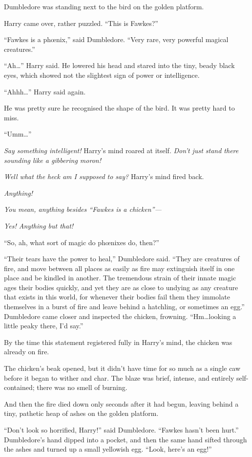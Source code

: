Dumbledore was standing next to the bird on the golden platform.

Harry came over, rather puzzled.
“This is Fawkes?”

“Fawkes is a phœnix,” said Dumbledore.
“Very rare, very powerful magical creatures.”

“Ah…” Harry said. He lowered his head and stared into the tiny, beady black eyes, which showed not the slightest sign of power or intelligence.

“Ahhh…” Harry said again.

He was pretty sure he recognised the shape of the bird. It was pretty hard to miss.

“Umm…”

\emph{Say something intelligent!} Harry’s mind roared at itself. \emph{Don’t just stand there sounding like a gibbering moron!}

\emph{Well what the heck am I \emph{supposed} to say?} Harry’s mind fired back.

\emph{Anything!}

\emph{You mean, anything besides
“Fawkes is a chicken”—}

\emph{Yes! Anything but that!}

“So, ah, what sort of magic do phœnixes do, then?”

“Their tears have the power to heal,” Dumbledore said.
“They are creatures of fire, and move between all places as easily as fire may extinguish itself in one place and be kindled in another. The tremendous strain of their innate magic ages their bodies quickly, and yet they are as close to undying as any creature that exists in this world, for whenever their bodies fail them they immolate themselves in a burst of fire and leave behind a hatchling, or sometimes an egg.” Dumbledore came closer and inspected the chicken, frowning.
“Hm…looking a little peaky there, I’d say.”

By the time this statement registered fully in Harry’s mind, the chicken was already on fire.

The chicken’s beak opened, but it didn’t have time for so much as a single caw before it began to wither and char. The blaze was brief, intense, and entirely self-contained; there was no smell of burning.

And then the fire died down only seconds after it had begun, leaving behind a tiny, pathetic heap of ashes on the golden platform.

“Don’t look so horrified, Harry!” said Dumbledore.
“Fawkes hasn’t been hurt.” Dumbledore’s hand dipped into a pocket, and then the same hand sifted through the ashes and turned up a small yellowish egg.
“Look, here’s an egg!”

